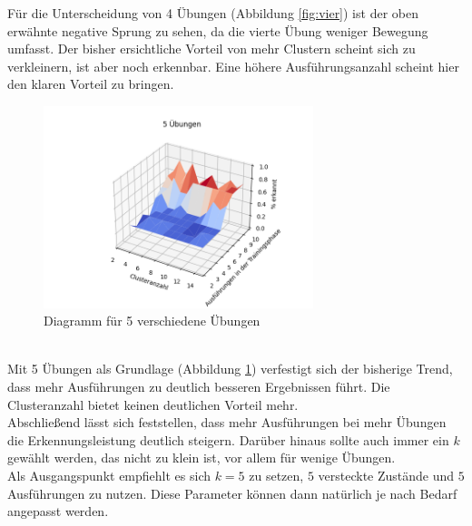 \documentclass{article}
\begin{document}
Für die Unterscheidung von 4 Übungen (Abbildung \ref{fig:vier}) ist der oben erwähnte negative Sprung zu sehen, da die vierte Übung weniger Bewegung umfasst.
Der bisher ersichtliche Vorteil von mehr Clustern scheint sich zu verkleinern, ist aber noch erkennbar.
Eine höhere Ausführungsanzahl scheint hier den klaren Vorteil zu bringen.\\
\medskip
\begin{figure}[htbp]
\centering
\includegraphics[width=0.7\textwidth]{figures/5_graph.png}
\caption{Diagramm für 5 verschiedene Übungen}
\label{fig:fuenf}
\end{figure}\\
Mit 5 Übungen als Grundlage (Abbildung \ref{fig:fuenf}) verfestigt sich der bisherige Trend, dass mehr Ausführungen zu deutlich besseren Ergebnissen führt.
Die Clusteranzahl bietet keinen deutlichen Vorteil mehr.\\
Abschließend lässt sich feststellen, dass mehr Ausführungen bei mehr Übungen die Erkennungsleistung deutlich steigern.
Darüber hinaus sollte auch immer ein $k$ gewählt werden, das nicht zu klein ist, vor allem für wenige Übungen.\\

Als Ausgangspunkt empfiehlt es sich $k=5$ zu setzen, $5$ versteckte Zustände und $5$ Ausführungen zu nutzen.
Diese Parameter können dann natürlich je nach Bedarf angepasst werden.

\newpage
{}


\end{document}

